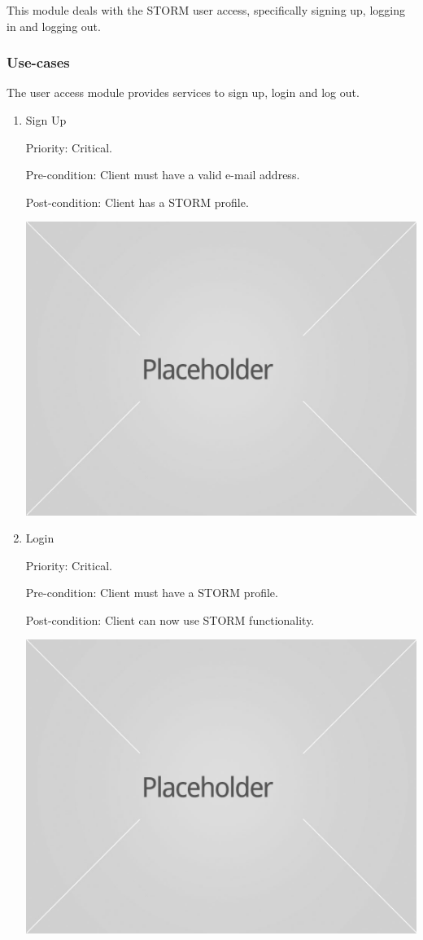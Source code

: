 This module deals with the STORM user access, specifically signing up, logging in and logging out.

\subsubsection{Use-cases}
The user access module provides services to sign up, login and log out.
\begin{enumerate}
\item Sign Up\par
Priority: Critical.\par
Pre-condition: Client must have a valid e-mail address.\par
Post-condition: Client has a STORM profile.\par
\includegraphics[width=13cm]{image.jpg}
    \rule{0\linewidth}{0.15\linewidth}\par
\item Login\par
Priority: Critical.\par
Pre-condition: Client must have a STORM profile.\par
Post-condition: Client can now use STORM functionality.\par
\includegraphics[width=13cm]{image.jpg}

\end{enumerate}
